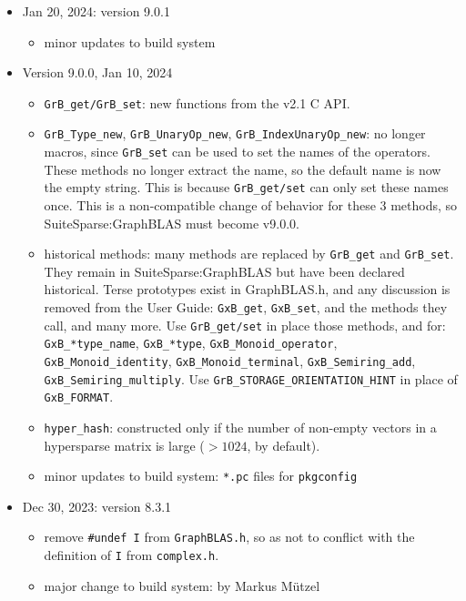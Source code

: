 \documentclass[12pt]{article}
\begin{document}
\begin{itemize}
\item Jan 20, 2024: version 9.0.1

    \begin{itemize}
    \item minor updates to build system
    \end{itemize}

\item Version 9.0.0, Jan 10, 2024

    \begin{itemize}
    \item \verb'GrB_get/GrB_set': new functions from the v2.1 C API.
    \item \verb'GrB_Type_new', \verb'GrB_UnaryOp_new',
        \verb'GrB_IndexUnaryOp_new': no longer macros, since \verb'GrB_set' can
        be used to set the names of the operators.  These methods no longer
        extract the name, so the default name is now the empty string.  This is
        because \verb'GrB_get/set' can only set these names once.  This is a
        non-compatible change of behavior for these 3 methods, so
        SuiteSparse:GraphBLAS must become v9.0.0.
    \item historical methods:  many methods are replaced by \verb'GrB_get' and
        \verb'GrB_set'.  They remain in SuiteSparse:GraphBLAS but have been
        declared historical.  Terse prototypes exist in GraphBLAS.h, and any
        discussion is removed from the User Guide:  \verb'GxB_get',
        \verb'GxB_set', and the methods they call, and many more.  Use
        \verb'GrB_get/set' in place those methods, and for:
        \verb'GxB_*type_name', \verb'GxB_*type', \verb'GxB_Monoid_operator',
        \verb'GxB_Monoid_identity', \verb'GxB_Monoid_terminal',
        \verb'GxB_Semiring_add', \verb'GxB_Semiring_multiply'.  Use \newline
        \verb'GrB_STORAGE_ORIENTATION_HINT' in place of \verb'GxB_FORMAT'.
    \item \verb'hyper_hash': constructed only if the number of non-empty
        vectors in a hypersparse matrix is large ($> 1024$, by default).
    \item minor updates to build system: \verb'*.pc' files for \verb'pkgconfig'
    \end{itemize}

\item Dec 30, 2023: version 8.3.1

    \begin{itemize}
    \item remove \verb'#undef I' from \verb'GraphBLAS.h', so as not to conflict
        with the definition of \verb'I' from \verb'complex.h'.
    \item major change to build system: by Markus M\"{u}tzel
    \end{itemize}


\end{itemize}
\end{document}
